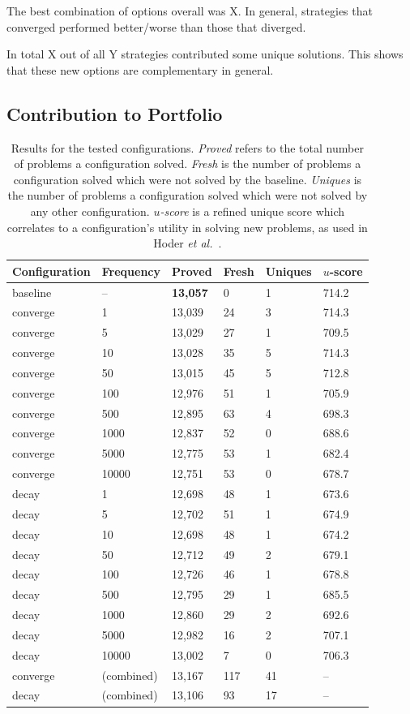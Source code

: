 \documentclass{llncs}
\begin{document}
The best combination of options overall was X. In general, strategies that converged performed better/worse than those that diverged.

In total X out of all Y strategies contributed some unique solutions. This shows that these new options are complementary in general.


\subsection{Contribution to Portfolio}


\begin{table}[t]
	\caption{
Results for the tested configurations.
\emph{Proved} refers to the total number of problems a configuration solved.
\emph{Fresh} is the number of problems a configuration solved which were not solved by the baseline.
\emph{Uniques} is the number of problems a configuration solved which were not solved by any other configuration.
\emph{\(u\)-score} is a refined unique score which correlates to a configuration's utility in solving new problems, as used in Hoder \emph{et al.}~\cite{u-score}.
	}
	\centering
	\begin{tabular}{l l l l l l}
		Configuration & Frequency & Proved & Fresh & Uniques & \(u\)-score\\
		\hline
		baseline & -- & \textbf{13,057} & 0 & 1 & 714.2\\ \hline
		converge & 1 & 13,039 & 24 & 3 & 714.3\\
		converge & 5 & 13,029 & 27 & 1 & 709.5\\
		converge & 10 & 13,028 & 35 & 5 & 714.3\\
		converge & 50 & 13,015 & 45 & 5 & 712.8\\
		converge & 100 & 12,976 & 51 & 1 & 705.9\\
		converge & 500 & 12,895 & 63 & 4 & 698.3\\
		converge & 1000 & 12,837 & 52 & 0 & 688.6\\
		converge & 5000 & 12,775 & 53 & 1 & 682.4\\
		converge & 10000 & 12,751 & 53 & 0 & 678.7\\ \hline
		decay & 1 & 12,698 & 48 & 1 & 673.6\\
		decay & 5 & 12,702 & 51 & 1 & 674.9\\
		decay & 10 & 12,698 & 48 & 1 & 674.2\\
		decay & 50 & 12,712 & 49 & 2 & 679.1\\
		decay & 100 & 12,726 & 46 & 1 & 678.8\\
		decay & 500 & 12,795 & 29 & 1 & 685.5\\
		decay & 1000 & 12,860 & 29 & 2 & 692.6\\
		decay & 5000 & 12,982 & 16 & 2 & 707.1\\
		decay & 10000 & 13,002 & 7 & 0 & 706.3\\
		\hline
		converge & (combined) & 13,167 & 117 & 41 & --\\
		decay & (combined) & 13,106 & 93 & 17 & --\\
	\end{tabular}
	\label{tab:results}
\end{table}
\end{document}
